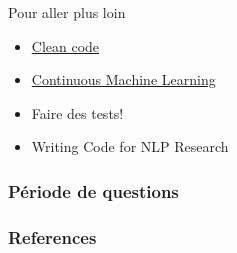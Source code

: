 \documentclass[aspectratio=169,10pt,xcolor=x11names,english,french]{beamer}
\begin{document}
	\begin{frame}{Pour aller plus loin}
		\begin{itemize}
			\item \href{https://www.oreilly.com/library/view/clean-code-a/9780136083238/}{Clean code}
			\item \href{https://github.com/iterative/cml}{Continuous Machine Learning}
			\item Faire des tests!
			\item Writing Code for NLP Research \cite{gardner-etal-2018-writing}
		\end{itemize}
	\end{frame}
	
	\begin{frame}
		\frametitle{Période de questions}
		
		\centering
		\fontsize{100}{100}\selectfont
		\faQuestion
		
	\end{frame}
	
	\begin{frame}[t, allowframebreaks]
		\frametitle{References}
		
		
	\end{frame}
	
	
	
	
\end{document}
